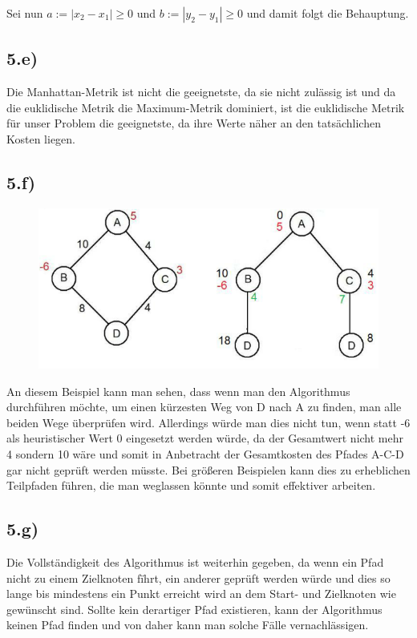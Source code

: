 \documentclass[a4paper]{article}
\begin{document}
Sei nun $a := |x_2- x_1| \geq 0$ und $b :=|y_2- y_1| \geq 0$ und damit folgt die Behauptung.

\subsection*{5.e)}
Die Manhattan-Metrik ist nicht die geeignetste, da sie nicht zul\"assig ist und da die euklidische Metrik die Maximum-Metrik dominiert, ist die euklidische Metrik f\"ur unser Problem die geeignetste, da ihre Werte n\"aher an den tats\"achlichen Kosten liegen.

\subsection*{5.f)}

\begin{figure}[h]
\centering
\includegraphics[width=0.75\columnwidth]{aufgabe5f}
\end{figure}


An diesem Beispiel kann man sehen, dass wenn man den Algorithmus durchf\"uhren m\"ochte, um einen k\"urzesten Weg von D nach A zu finden, man alle beiden Wege \"uberpr\"ufen wird. Allerdings w\"urde man dies nicht tun, wenn statt -6 als heuristischer Wert 0 eingesetzt werden w\"urde, da der Gesamtwert nicht mehr 4 sondern 10 w\"are und somit in Anbetracht der Gesamtkosten des Pfades A-C-D gar nicht gepr\"uft werden m\"usste. Bei gr\"o{\ss}eren Beispielen kann dies zu erheblichen Teilpfaden f\"uhren, die man weglassen k\"onnte und somit effektiver arbeiten.

\subsection*{5.g)}
Die Vollst\"andigkeit des Algorithmus ist weiterhin gegeben, da wenn ein Pfad nicht zu einem Zielknoten f\"ihrt, ein anderer gepr\"uft werden w\"urde und dies so lange bis mindestens ein Punkt erreicht wird an dem Start- und Zielknoten wie gew\"unscht sind. Sollte kein
derartiger Pfad existieren, kann der Algorithmus keinen Pfad finden und von daher kann man solche F\"alle vernachl\"assigen.
\end{document}
